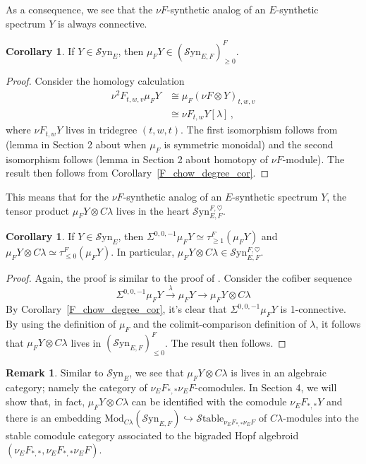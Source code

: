 \documentclass[10pt]{amsart}
\theoremstyle{definition}
\numberwithin{figure}{section}
\numberwithin{equation}{section}
\newtheorem{corollary}[figure]{Corollary}
\newtheorem{remark}[figure]{Remark}
\theoremstyle{cited}
\newcommand{\Mod}{\mathrm{Mod}}
\newcommand{\Syn}{\mathcal{S}\mathrm{yn}}
\newcommand{\Stable}{\mathcal{S}\mathrm{table}}
\begin{document}
As a consequence, we see that the $\nu F$-synthetic analog of an $E$-synthetic spectrum $Y$ is always connective.
  
  \begin{corollary}
      If $Y\in\Syn_E$, then $\mu_F Y\in (\Syn_{E,F})_{\geq 0}^F$.
  \end{corollary}
  
  \begin{proof}
      Consider the homology calculation
  \begin{equation*}
      \begin{aligned}
          \nu^2F_{t,w,v}\mu_FY &\cong \mu_F(\nu F\otimes Y)_{t,w,v} \\
          &\cong \nu F_{t,w} Y[\lambda]\, ,
      \end{aligned}
  \end{equation*}
  where $\nu F_{t,w} Y$ lives in tridegree $(t,w,t)$. The first isomorphism follows from (lemma in Section 2 about when $\mu_F$ is symmetric monoidal) and the second isomorphism follows (lemma in Section 2 about homotopy of $\nu F$-module). The result then follows from Corollary~\ref{F_chow_degree_cor}.
  \end{proof}
  
  This means that for the $\nu F$-synthetic analog of an $E$-synthetic spectrum $Y$, the tensor product $\mu_FY\otimes C\lambda$ lives in the heart $\Syn_{E,F}^{F,\heartsuit}$.
  
  \begin{corollary}
  If $Y\in\Syn_E$, then $\Sigma^{0,0,-1}\mu_FY\simeq \tau_{\geq 1}^F(\mu_FY)$ and $\mu_F Y\otimes C\lambda\simeq \tau_{\leq 0}^F(\mu_FY)$. In particular, $\mu_FY\otimes C\lambda\in \Syn_{E,F}^{F,\heartsuit}$.  
  \end{corollary}
  
  \begin{proof}
     Again, the proof is similar to the proof of \cite[Lemma 4.29]{Pst22}. Consider the cofiber sequence
     $$
  \Sigma^{0,0,-1}\mu_FY\xrightarrow{\lambda}\mu_FY\to \mu_FY\otimes C\lambda
     $$
     By Corollary~\ref{F_chow_degree_cor}, it's clear that $\Sigma^{0,0,-1}\mu_FY$ is 1-connective. By using the definition of $\mu_F$ and the colimit-comparison definition of $\lambda$, it follows that $\mu_FY\otimes C\lambda$ lives in $(\Syn_{E,F})_{\leq 0}^F$. The result then follows.
  \end{proof}
  
  \begin{remark}
  Similar to $\Syn_E$, we see that $\mu_FY\otimes C\lambda$ is lives in an algebraic category; namely the category of $\nu_EF_{*,*}\nu_E F$-comodules. In Section 4, we will show that, in fact, $\mu_FY\otimes C\lambda$ can be identified with the comodule $\nu_{E}F_{*,*}Y$ and there is an embedding $\Mod_{C\lambda}(\Syn_{E,F})\hookrightarrow \Stable_{\nu_EF_{*,*}\nu_EF}$ of $C\lambda$-modules into the stable comodule category associated to the bigraded Hopf algebroid $(\nu_EF_{*,*},\nu_EF_{*,*}\nu_EF)$.    
  \end{remark}
\end{document}
